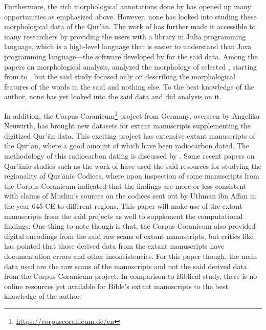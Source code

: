 Furthermore, the rich morphological annotations done by  has opened up many opportunities as emphasized above. However, none has looked into studing these morphological data of the Qur'\=an. The work of  has further made it accessible to many researchers by providing the users with a library in Julia programming language, which is a high-level language that is easier to understand than Java programming language---the software developed by  for the said data. Among the papers on morphological analysis,  analyzed the morphology of selected  , starting from   to  , but the said study focused only on describing the morphological features of the words in the said   and nothing else. To the best knowledge of the author, none has yet looked into the said data and did analysis on it.

In addition, the Corpus Coranicum\footnote{\url{https://corpuscoranicum.de/en}} project from Germany, overseen by Angelika Neuwirth, has brought new datasets for extant manuscripts supplementing the digitized Qur'\=an data. This exciting project has extensive extant manuscripts of the Qur'\=an, where a good amount of which have been radiocarbon dated. The methodology of this radiocarbon dating is discussed by \cite{Radiocarbon14CDatingofQurnManuscripts}. Some recent papers on Qur'\=anic studies such as the work of \cite{sidky2020} have used the said resources for studying the regionality of Qur'\=anic Codices, where upon inspection of some manuscripts from the Corpus Coranicum indicated that the findings are more or less consistent with claims of Muslim's sources on the codices sent out by Uthman ibn Affan  in the year 645 CE to different regions. This paper will make use of the extant manuscripts from the said projects as well to supplement the computational findings. One thing to note though is that, the Corpus Coranicum also provided digital encodings from the said raw scans of extant manuscripts, but critics like  has pointed that those derived data from the extant manuscripts have documentation errors and other inconsistencies. For this paper though, the main data used are the raw scans of the manuscripts and not the said derived data from the Corpus Coranicum project. In comparison to Biblical study, there is no online resources yet available for Bible's extant manuscripts to the best knowledge of the author.  

